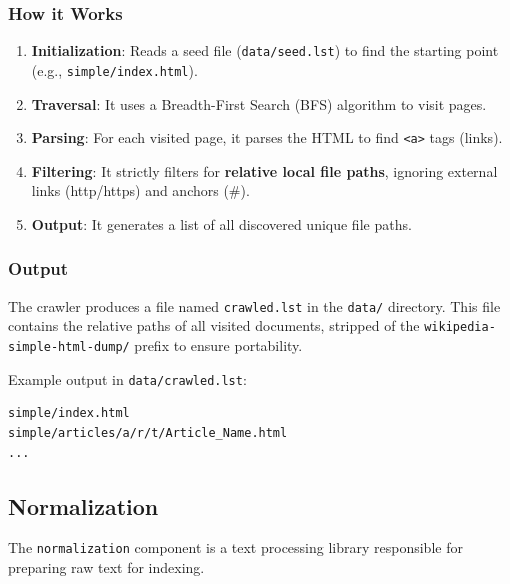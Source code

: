 \documentclass[11pt, a4paper]{article}
\begin{document}
\subsubsection*{How it Works}
\begin{enumerate}
    \item \textbf{Initialization}: Reads a seed file (\texttt{data/seed.lst}) to find the starting point (e.g., \texttt{simple/index.html}).
    \item \textbf{Traversal}: It uses a Breadth-First Search (BFS) algorithm to visit pages.
    \item \textbf{Parsing}: For each visited page, it parses the HTML to find \texttt{<a>} tags (links).
    \item \textbf{Filtering}: It strictly filters for \textbf{relative local file paths}, ignoring external links (http/https) and anchors (\#).
    \item \textbf{Output}: It generates a list of all discovered unique file paths.
\end{enumerate}

\subsubsection*{Output}
The crawler produces a file named \texttt{crawled.lst} in the \texttt{data/} directory. This file contains the relative paths of all visited documents, stripped of the \texttt{wikipedia-simple-html-dump/} prefix to ensure portability.

Example output in \texttt{data/crawled.lst}:
\begin{verbatim}
simple/index.html
simple/articles/a/r/t/Article_Name.html
...
\end{verbatim}

\subsection{Normalization}
The \texttt{normalization} component is a text processing library responsible for preparing raw text for indexing.
\end{document}

